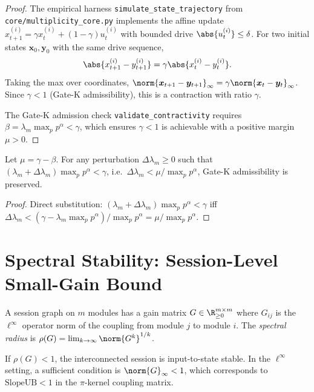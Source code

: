 \documentclass[11pt]{article}
\begin{document}
\begin{proof}
The empirical harness \texttt{simulate\_state\_trajectory} from
\texttt{core/multiplicity\_core.py} implements the affine update
$x_{t+1}^{(i)} = \gamma x_t^{(i)} + (1-\gamma) u_t^{(i)}$ with bounded
drive $\abs{u_t^{(i)}}\leq\delta$.  For two initial states $\bm{x}_0,\bm{y}_0$
with the same drive sequence,
\[
  \abs{x_{t+1}^{(i)}-y_{t+1}^{(i)}} = \gamma\abs{x_t^{(i)}-y_t^{(i)}}.
\]
Taking the max over coordinates,
$\norm{\bm{x}_{t+1}-\bm{y}_{t+1}}_\infty = \gamma\norm{\bm{x}_t-\bm{y}_t}_\infty$.
Since $\gamma<1$ (Gate-K admissibility), this is a contraction with ratio $\gamma$.

The Gate-K admission check \texttt{validate\_contractivity} requires
$\beta = \lambda_m\max_p p^\alpha < \gamma$, which ensures $\gamma < 1$ is
achievable with a positive margin $\mu>0$.
\end{proof}

\begin{proposition}
Let $\mu = \gamma - \beta$.  For any perturbation $\Delta\lambda_m\geq 0$
such that $(\lambda_m + \Delta\lambda_m)\max_p p^\alpha < \gamma$, i.e.\
$\Delta\lambda_m < \mu / \max_p p^\alpha$, Gate-K admissibility is preserved.
\end{proposition}

\begin{proof}
Direct substitution: $(\lambda_m+\Delta\lambda_m)\max_p p^\alpha < \gamma$
iff $\Delta\lambda_m < (\gamma - \lambda_m\max_p p^\alpha)/\max_p p^\alpha = \mu/\max_p p^\alpha$.
\end{proof}

\section{Spectral Stability: Session-Level Small-Gain Bound}

\begin{definition}
A session graph on $m$ modules has a gain matrix $G\in\R^{m\times m}_{\geq 0}$
where $G_{ij}$ is the $\ell^\infty$ operator norm of the coupling from module
$j$ to module $i$.  The \emph{spectral radius} is
$\rho(G) = \lim_{k\to\infty}\norm{G^k}^{1/k}$.
\end{definition}

\begin{theorem}
\label{thm:smallgain}
If $\rho(G) < 1$, the interconnected session is input-to-state stable.
In the $\ell^\infty$ setting, a sufficient condition is
$\norm{G}_\infty < 1$,
which corresponds to $\mathrm{SlopeUB} < 1$ in the $\pi$-kernel coupling
matrix.
\end{theorem}
\end{document}
